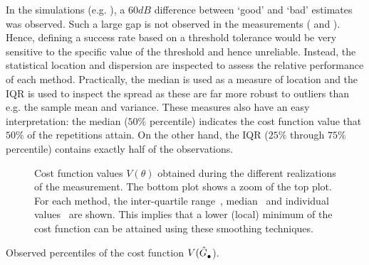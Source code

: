 \begin{remark}
  In the simulations (e.g. ), a $60\unit{dB}$ difference between `good' and `bad' estimates was observed.
  Such a large gap is not observed in the measurements ( and ).
  Hence, defining a success rate based on a threshold tolerance would be very sensitive to the specific value of the threshold and hence unreliable.
  Instead, the statistical location and dispersion are inspected to assess the relative performance of each method.
  Practically, the median is used as a measure of location and the \gls{IQR} is used to inspect the spread as these are far more robust to outliers than e.g. the sample mean and variance.
  These measures also have an easy interpretation: the median ($50\%$ percentile) indicates the cost function value that $50\%$ of the repetitions attain.
  On the other hand, the \gls{IQR} ($25\%$ through $75\%$ percentile) contains  exactly half of the observations.
\end{remark}

\begin{figure}[p]
  \centering
  \setlength{\figurewidth}{0.85\onecolumnwidth}
  \setlength{\figureheight}{0.68\figurewidth}
  \setlength{\figurewidth}{0.75\onecolumnwidth}
  
  \caption[Cost function values over the different measurements.]{Cost function values $V(\theta)$ obtained during the different realizations of the measurement.
  The bottom plot shows a zoom of the top plot.
  For each method, the inter-quartile range~, median~ and individual values~ are shown.
  This implies that a lower (local) minimum of the cost function can be attained using these smoothing techniques.}
  \label{fig:costMeasurements}
\end{figure}

\begin{table}[p]
  \centering
  \caption{Observed percentiles of the cost function $V(\hat{G}_{\mathrm{\bullet}}^{\mathrm{}}$).}
% 
  \label{tbl:costMeasurements}
\end{table}



